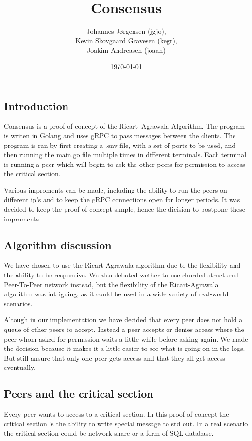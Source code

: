 \documentclass[a4paper,11pt]{article}
\title{Consensus}
\author{Johannes Jørgensen (jgjo),\\ Kevin Skovgaard Gravesen (kegr),\\ Joakim Andreasen (joaan)}
\date{\today}
\begin{document}
 

\maketitle

\subsection*{Introduction}
Consensus is a proof of concept of the Ricart–Agrawala Algorithm. The program is writen in Golang and uses gRPC to pass messages between the clients.
The program is ran by first creating a .env file, with a set of ports to be used, and then running the main.go file multiple times in different terminals.
Each terminal is running a peer which will begin to ask the other peers for permission to access the critical section.

Various improments can be made, including the ability to run the peers on different ip's and to keep the gRPC connections open for longer periods.
It was decided to keep the proof of concept simple, hence the dicision to postpone these improments.

\subsection*{Algorithm discussion}
We have chosen to use the Ricart-Agrawala algorithm due to the flexibility and the ability to be responsive. We also debated wether to use chorded structured Peer-To-Peer
network instead, but the flexibility of the Ricart-Agrawala algorithm was intriguing, as it could be used in a wide variety of real-world scenarios.

Altough in our implementation we have decided that every peer does not hold a queue of other peers to accept. Instead a peer accepts or denies access where the peer whom asked for permission waits a little while before asking again.
We made the decision because it makes it a little easier to see what is going on in the logs. But still ansure that only one peer gets access and that they all get access eventually.

\subsection*{Peers and the critical section}
Every peer wants to access to a critical section. In this proof of concept the critical section is the ability to write special message to std out.
In a real scenario the critical section could be network share or a form of SQL database.
\end{document}
